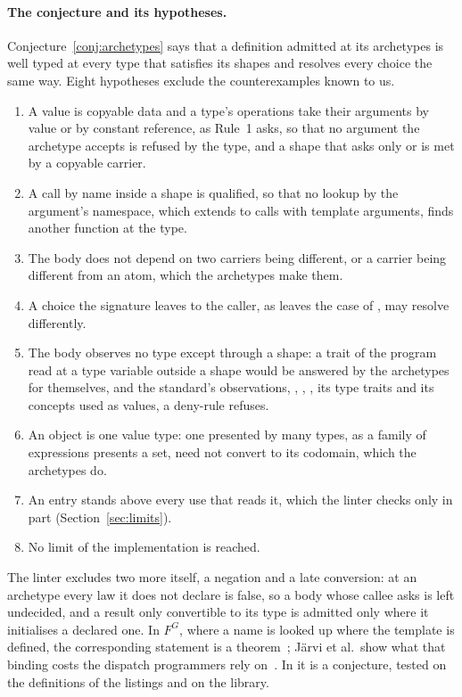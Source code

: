 \paragraph{The conjecture and its hypotheses.}
\label{app:lint:conjecture}
Conjecture~\ref{conj:archetypes} says that a definition admitted at its archetypes is well typed at every type that satisfies its shapes and resolves every choice the same way.
Eight hypotheses exclude the counterexamples known to us.
\begin{enumerate}
\item A value is copyable data and a type's operations take their arguments by value or by constant reference, as Rule~1 asks, so that no argument the archetype accepts is refused by the type, and a shape that asks only  or  is met by a copyable carrier.
\item A call by name inside a shape is qualified, so that no lookup by the argument's namespace, which  extends to calls with template arguments, finds another function at the type.
\item The body does not depend on two carriers being different, or a carrier being different from an atom, which the archetypes make them.
\item A choice the signature leaves to the caller, as  leaves the case of , may resolve differently.
\item The body observes no type except through a shape: a trait of the program read at a type variable outside a shape would be answered by the archetypes for themselves, and the standard's observations, , , , its type traits and its concepts used as values, a deny-rule refuses.
\item An object is one value type: one presented by many types, as a family of expressions presents a set, need not convert to its codomain, which the archetypes do.
\item An entry stands above every use that reads it, which the linter checks only in part (Section~\ref{sec:limits}).
\item No limit of the implementation is reached.
\end{enumerate}
The linter excludes two more itself, a negation and a late conversion: at an archetype every law it does not declare is false, so a body whose callee asks  is left undecided, and a result only convertible to its type is admitted only where it initialises a declared one.
In $F^G$, where a name is looked up where the template is defined, the corresponding statement is a theorem~\cite{siek2005essential}; Järvi et al.\ show what that binding costs the dispatch \Cpp{} programmers rely on~\cite{jarvi2006specialization}.
In \Cpp{} it is a conjecture, tested on the definitions of the listings and on the library.
